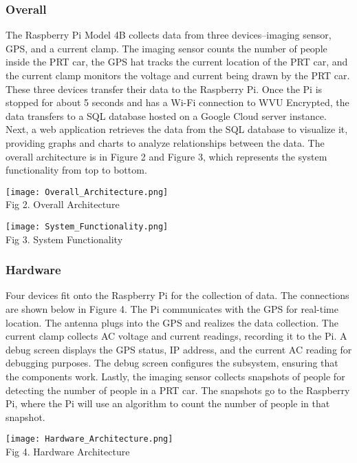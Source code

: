 \subsubsection{Overall}
The Raspberry Pi Model 4B collects data from three devices--imaging sensor, GPS, and a current clamp. 
The imaging sensor counts the number of people inside the PRT car, the GPS hat tracks the current location of the PRT car, and the current clamp monitors the voltage and current being drawn by the PRT car. 
These three devices transfer their data to the Raspberry Pi. 
Once the Pi is stopped for about 5 seconds and has a Wi-Fi connection to WVU Encrypted, the data transfers to a SQL database hosted on a Google Cloud server instance. 
Next, a web application retrieves the data from the SQL database to visualize it, providing graphs and charts to analyze relationships between the data. 
The overall architecture is in Figure 2 and Figure 3, which represents the system functionality from top to bottom.

\begin{center}
    \texttt{[image: Overall\_Architecture.png]}\\
    Fig 2. Overall Architecture
\end{center}

\begin{center}
    \texttt{[image: System\_Functionality.png]}\\
    Fig 3. System Functionality
\end{center}

\subsubsection{Hardware}
Four devices fit onto the Raspberry Pi for the collection of data. 
The connections are shown below in Figure 4. 
The Pi communicates with the GPS for real-time location. 
The antenna plugs into the GPS and realizes the data collection. 
The current clamp collects AC voltage and current readings, recording it to the Pi.
A debug screen displays the GPS status, IP address, and the current AC reading for debugging purposes. 
The debug screen configures the subsystem, ensuring that the components work. 
Lastly, the imaging sensor collects snapshots of people for detecting the number of people in a PRT car. 
The snapshots go to the Raspberry Pi, where the Pi will use an algorithm to count the number of people in that snapshot.

\begin{center}
    \texttt{[image: Hardware\_Architecture.png]}\\
    Fig 4. Hardware Architecture
\end{center}

